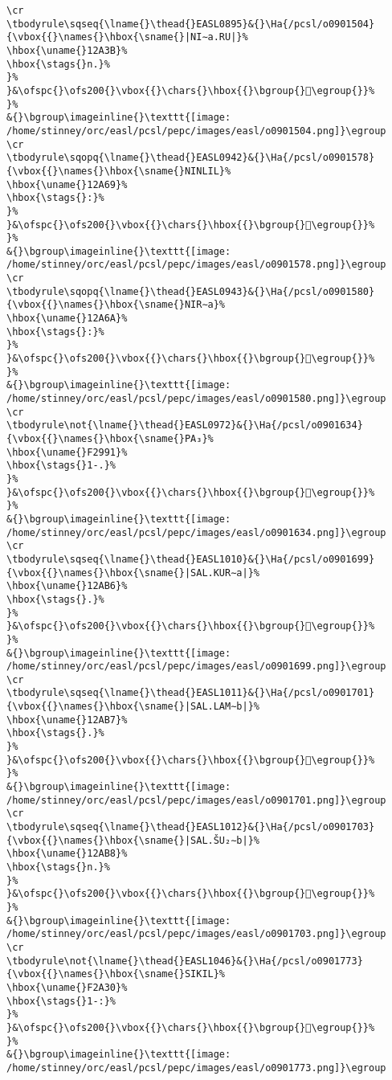 \begin{verbatim}
\cr
\tbodyrule\sqseq{\lname{}\thead{}EASL0895}&{}\Ha{/pcsl/o0901504}{\vbox{{}\names{}\hbox{\sname{}|NI∼a.RU|}%
\hbox{\uname{}12A3B}%
\hbox{\stags{}n.}%
}%
}&\ofspc{}\ofs200{}\vbox{{}\chars{}\hbox{{}\bgroup{}𒨻\egroup{}}%
}%
&{}\bgroup\imageinline{}\texttt{[image: /home/stinney/orc/easl/pcsl/pepc/images/easl/o0901504.png]}\egroup
\cr
\tbodyrule\sqopq{\lname{}\thead{}EASL0942}&{}\Ha{/pcsl/o0901578}{\vbox{{}\names{}\hbox{\sname{}NINLIL}%
\hbox{\uname{}12A69}%
\hbox{\stags{}:}%
}%
}&\ofspc{}\ofs200{}\vbox{{}\chars{}\hbox{{}\bgroup{}𒩩\egroup{}}%
}%
&{}\bgroup\imageinline{}\texttt{[image: /home/stinney/orc/easl/pcsl/pepc/images/easl/o0901578.png]}\egroup
\cr
\tbodyrule\sqopq{\lname{}\thead{}EASL0943}&{}\Ha{/pcsl/o0901580}{\vbox{{}\names{}\hbox{\sname{}NIR∼a}%
\hbox{\uname{}12A6A}%
\hbox{\stags{}:}%
}%
}&\ofspc{}\ofs200{}\vbox{{}\chars{}\hbox{{}\bgroup{}𒩪\egroup{}}%
}%
&{}\bgroup\imageinline{}\texttt{[image: /home/stinney/orc/easl/pcsl/pepc/images/easl/o0901580.png]}\egroup
\cr
\tbodyrule\not{\lname{}\thead{}EASL0972}&{}\Ha{/pcsl/o0901634}{\vbox{{}\names{}\hbox{\sname{}PA₃}%
\hbox{\uname{}F2991}%
\hbox{\stags{}1-.}%
}%
}&\ofspc{}\ofs200{}\vbox{{}\chars{}\hbox{{}\bgroup{}󲦑\egroup{}}%
}%
&{}\bgroup\imageinline{}\texttt{[image: /home/stinney/orc/easl/pcsl/pepc/images/easl/o0901634.png]}\egroup
\cr
\tbodyrule\sqseq{\lname{}\thead{}EASL1010}&{}\Ha{/pcsl/o0901699}{\vbox{{}\names{}\hbox{\sname{}|SAL.KUR∼a|}%
\hbox{\uname{}12AB6}%
\hbox{\stags{}.}%
}%
}&\ofspc{}\ofs200{}\vbox{{}\chars{}\hbox{{}\bgroup{}𒪶\egroup{}}%
}%
&{}\bgroup\imageinline{}\texttt{[image: /home/stinney/orc/easl/pcsl/pepc/images/easl/o0901699.png]}\egroup
\cr
\tbodyrule\sqseq{\lname{}\thead{}EASL1011}&{}\Ha{/pcsl/o0901701}{\vbox{{}\names{}\hbox{\sname{}|SAL.LAM∼b|}%
\hbox{\uname{}12AB7}%
\hbox{\stags{}.}%
}%
}&\ofspc{}\ofs200{}\vbox{{}\chars{}\hbox{{}\bgroup{}𒪷\egroup{}}%
}%
&{}\bgroup\imageinline{}\texttt{[image: /home/stinney/orc/easl/pcsl/pepc/images/easl/o0901701.png]}\egroup
\cr
\tbodyrule\sqseq{\lname{}\thead{}EASL1012}&{}\Ha{/pcsl/o0901703}{\vbox{{}\names{}\hbox{\sname{}|SAL.ŠU₂∼b|}%
\hbox{\uname{}12AB8}%
\hbox{\stags{}n.}%
}%
}&\ofspc{}\ofs200{}\vbox{{}\chars{}\hbox{{}\bgroup{}𒪸\egroup{}}%
}%
&{}\bgroup\imageinline{}\texttt{[image: /home/stinney/orc/easl/pcsl/pepc/images/easl/o0901703.png]}\egroup
\cr
\tbodyrule\not{\lname{}\thead{}EASL1046}&{}\Ha{/pcsl/o0901773}{\vbox{{}\names{}\hbox{\sname{}SIKIL}%
\hbox{\uname{}F2A30}%
\hbox{\stags{}1-:}%
}%
}&\ofspc{}\ofs200{}\vbox{{}\chars{}\hbox{{}\bgroup{}󲨰\egroup{}}%
}%
&{}\bgroup\imageinline{}\texttt{[image: /home/stinney/orc/easl/pcsl/pepc/images/easl/o0901773.png]}\egroup

\end{verbatim}
